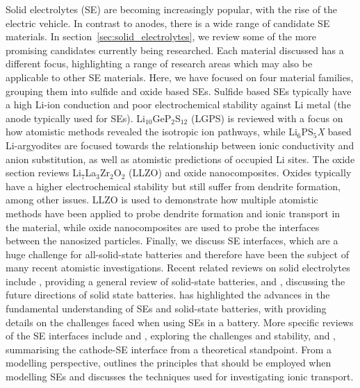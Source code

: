 \documentclass[../main.tex]{subfiles}
\begin{document}
Solid electrolytes (SE) are becoming increasingly popular, with the rise of the electric vehicle. In contrast to anodes, there is a wide range of candidate SE materials. In section~\ref{sec:solid_electrolytes}, we review some of the more promising candidates currently being researched. Each material discussed has a different focus, highlighting a range of research areas which may also be applicable to other SE materials. Here, we have focused on four material families, grouping them into sulfide and oxide based SEs. Sulfide based SEs typically have a high Li-ion conduction and poor electrochemical stability against Li metal (the anode typically used for SEs). \cite{Zhu2015, Zhang2019se_rev} Li$_{10}$GeP$_2$S$_{12}$ (LGPS) is reviewed with a focus on how atomistic methods revealed the isotropic ion pathways, while Li$_6$PS$_5$\textit{X} based Li-argyodites are focused towards the relationship between ionic conductivity and anion substitution, as well as atomistic predictions of occupied Li sites. The oxide section reviews Li$_7$La$_3$Zr$_2$O$_2$ (LLZO) and oxide nanocomposites. Oxides typically have a higher electrochemical stability but still suffer from dendrite formation, among other issues.\cite{Zhu2015} LLZO is used to demonstrate how multiple atomistic methods have been applied to probe dendrite formation and ionic transport in the material, while oxide nanocomposites are used to probe the interfaces between the nanosized particles. Finally, we discuss SE interfaces, which are a huge challenge for all-solid-state batteries and therefore have been the subject of many recent atomistic investigations. Recent related reviews on solid electrolytes include \citeauthor{Sun2017se_review} \cite{Sun2017se_review}, providing a general review of solid-state batteries, and \citeauthor{Zhang2018se_review}, \cite{Zhang2018se_review} discussing the future directions of solid state batteries. \citeauthor{famprikis_fundamentals_2019} \cite{famprikis_fundamentals_2019} has highlighted the advances in the fundamental understanding of SEs and solid-state batteries, with \citeauthor{Gurung2019} \cite{Gurung2019} providing details on the challenges faced when using SEs in a battery. More specific reviews of the SE interfaces include \citeauthor{Xu2018exp} \cite{Xu2018exp} and \citeauthor{Xiao2020interfacerev} \cite{Xiao2020interfacerev}, exploring the challenges and stability, and \citeauthor{Tateyama2019} \cite{Tateyama2019}, summarising the cathode-SE interface from a theoretical standpoint. From a modelling perspective, \citeauthor{Ceder2018} \cite{Ceder2018} outlines the principles that should be employed when modelling SEs and \citeauthor{Gao2020_ion_transport} \cite{Gao2020_ion_transport} discusses the techniques used for investigating ionic transport.
\end{document}
